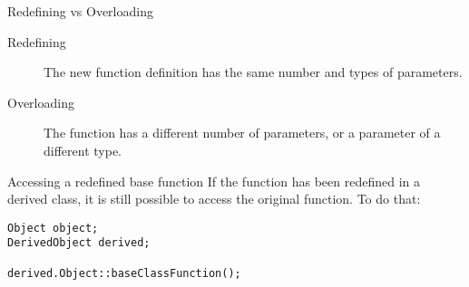 \documentclass[\main/notes.tex]{subfiles}
\begin{document}
		\begin{sidenote}{Redefining vs Overloading}
			\begin{description}
				\item[Redefining] The new function definition has the same number and types of parameters.
				\item[Overloading] The function has a different number of parameters, or a parameter of a different type.
			\end{description}
		\end{sidenote}
		\begin{sidenote}{Accessing a redefined base function}
			If the function has been redefined in a derived class, it is still possible to access the original function. To do that:
			\begin{verbatim}
Object object;
DerivedObject derived;

derived.Object::baseClassFunction();
			\end{verbatim}
		\end{sidenote}
\end{document}
